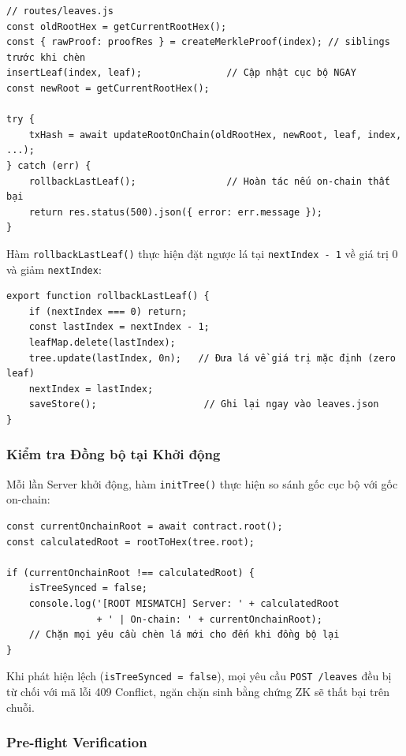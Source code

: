 \documentclass[../DoAn.tex]{subfiles}
\begin{document}
\begin{verbatim}
// routes/leaves.js
const oldRootHex = getCurrentRootHex();
const { rawProof: proofRes } = createMerkleProof(index); // siblings trước khi chèn
insertLeaf(index, leaf);               // Cập nhật cục bộ NGAY
const newRoot = getCurrentRootHex();

try {
    txHash = await updateRootOnChain(oldRootHex, newRoot, leaf, index, ...);
} catch (err) {
    rollbackLastLeaf();                // Hoàn tác nếu on-chain thất bại
    return res.status(500).json({ error: err.message });
}
\end{verbatim}

Hàm \texttt{rollbackLastLeaf()} thực hiện đặt ngược lá tại \texttt{nextIndex - 1} về giá trị 0 và giảm \texttt{nextIndex}:

\begin{verbatim}
export function rollbackLastLeaf() {
    if (nextIndex === 0) return;
    const lastIndex = nextIndex - 1;
    leafMap.delete(lastIndex);
    tree.update(lastIndex, 0n);   // Đưa lá về giá trị mặc định (zero leaf)
    nextIndex = lastIndex;
    saveStore();                   // Ghi lại ngay vào leaves.json
}
\end{verbatim}

\subsubsection{Kiểm tra Đồng bộ tại Khởi động}

Mỗi lần Server khởi động, hàm \texttt{initTree()} thực hiện so sánh gốc cục bộ với gốc on-chain:

\begin{verbatim}
const currentOnchainRoot = await contract.root();
const calculatedRoot = rootToHex(tree.root);

if (currentOnchainRoot !== calculatedRoot) {
    isTreeSynced = false;
    console.log('[ROOT MISMATCH] Server: ' + calculatedRoot
                + ' | On-chain: ' + currentOnchainRoot);
    // Chặn mọi yêu cầu chèn lá mới cho đến khi đồng bộ lại
}
\end{verbatim}

Khi phát hiện lệch (\texttt{isTreeSynced = false}), mọi yêu cầu \texttt{POST /leaves} đều bị từ chối với mã lỗi 409 Conflict, ngăn chặn sinh bằng chứng ZK sẽ thất bại trên chuỗi.

\subsubsection{Pre-flight Verification}
\end{document}
